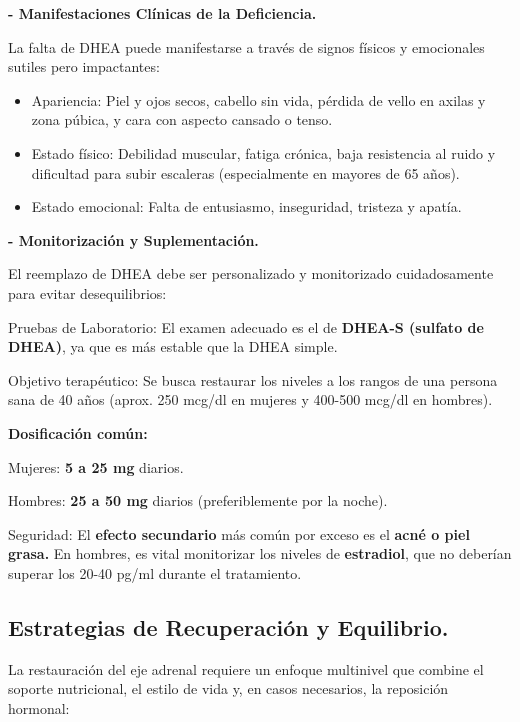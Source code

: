 \documentclass[
  spanish,
]{article}
\begin{document}
\textbf{- Manifestaciones Clínicas de la Deficiencia.}

La falta de DHEA puede manifestarse a través de signos físicos y emocionales sutiles pero impactantes:

\begin{itemize}
\item
  Apariencia: Piel y ojos secos, cabello sin vida, pérdida de vello en axilas y zona púbica, y cara con aspecto cansado o tenso.
\item
  Estado físico: Debilidad muscular, fatiga crónica, baja resistencia al ruido y dificultad para subir escaleras (especialmente en mayores de 65 años).
\item
  Estado emocional: Falta de entusiasmo, inseguridad, tristeza y apatía.
\end{itemize}

\textbf{- Monitorización y Suplementación.}

El reemplazo de DHEA debe ser personalizado y monitorizado cuidadosamente para evitar desequilibrios:

Pruebas de Laboratorio: El examen adecuado es el de \textbf{DHEA-S (sulfato de DHEA)}, ya que es más estable que la DHEA simple.

Objetivo terapéutico: Se busca restaurar los niveles a los rangos de una persona sana de 40 años (aprox. 250 mcg/dl en mujeres y 400-500 mcg/dl en hombres).

\textbf{Dosificación común:}

Mujeres: \textbf{5 a 25 mg} diarios.

Hombres: \textbf{25 a 50 mg} diarios (preferiblemente por la noche).

Seguridad: El \textbf{efecto secundario} más común por exceso es el \textbf{acné o piel grasa.} En hombres, es vital monitorizar los niveles de \textbf{estradiol}, que no deberían superar los 20-40 pg/ml durante el tratamiento.

\subsection{Estrategias de Recuperación y Equilibrio.}\label{estrategias-de-recuperaciuxf3n-y-equilibrio.}

La restauración del eje adrenal requiere un enfoque multinivel que combine el soporte nutricional, el estilo de vida y, en casos necesarios, la reposición hormonal:
\end{document}
